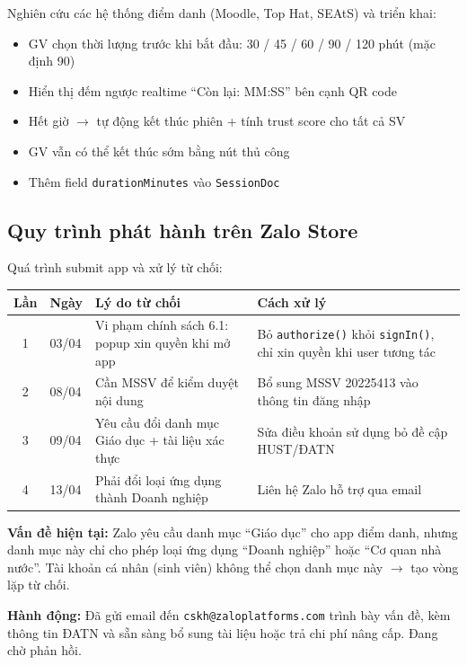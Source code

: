 \documentclass{article}
\begin{document}
Nghiên cứu các hệ thống điểm danh (Moodle, Top Hat, SEAtS) và triển khai:

\begin{itemize}[leftmargin=1.5em]
  \item GV chọn thời lượng trước khi bắt đầu: 30 / 45 / 60 / 90 / 120 phút (mặc định 90)
  \item Hiển thị đếm ngược realtime ``Còn lại: MM:SS'' bên cạnh QR code
  \item Hết giờ $\rightarrow$ tự động kết thúc phiên + tính trust score cho tất cả SV
  \item GV vẫn có thể kết thúc sớm bằng nút thủ công
  \item Thêm field \texttt{durationMinutes} vào \texttt{SessionDoc}
\end{itemize}

\subsection{Quy trình phát hành trên Zalo Store}

Quá trình submit app và xử lý từ chối:

\begin{center}
\begin{tabularx}{\textwidth}{@{}c l X X@{}}
\toprule
\textbf{Lần} & \textbf{Ngày} & \textbf{Lý do từ chối} & \textbf{Cách xử lý} \\
\midrule
1 & 03/04 & Vi phạm chính sách 6.1: popup xin quyền khi mở app & Bỏ \texttt{authorize()} khỏi \texttt{signIn()}, chỉ xin quyền khi user tương tác \\
2 & 08/04 & Cần MSSV để kiểm duyệt nội dung & Bổ sung MSSV 20225413 vào thông tin đăng nhập \\
3 & 09/04 & Yêu cầu đổi danh mục Giáo dục + tài liệu xác thực & Sửa điều khoản sử dụng bỏ đề cập HUST/ĐATN \\
4 & 13/04 & Phải đổi loại ứng dụng thành Doanh nghiệp & Liên hệ Zalo hỗ trợ qua email \\
\bottomrule
\end{tabularx}
\end{center}

\textbf{Vấn đề hiện tại:} Zalo yêu cầu danh mục ``Giáo dục'' cho app điểm danh, nhưng danh mục này chỉ cho phép loại ứng dụng ``Doanh nghiệp'' hoặc ``Cơ quan nhà nước''. Tài khoản cá nhân (sinh viên) không thể chọn danh mục này $\rightarrow$ tạo vòng lặp từ chối.

\textbf{Hành động:} Đã gửi email đến \texttt{cskh@zaloplatforms.com} trình bày vấn đề, kèm thông tin ĐATN và sẵn sàng bổ sung tài liệu hoặc trả chi phí nâng cấp. Đang chờ phản hồi.
\end{document}
